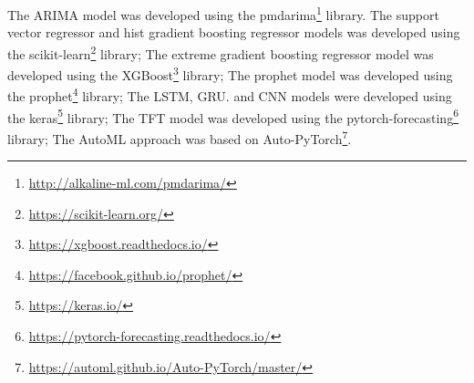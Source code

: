 The ARIMA model was developed using the pmdarima\footnote{ \url{http://alkaline-ml.com/pmdarima/} } library.
The support vector regressor and hist gradient boosting regressor models was developed using the scikit-learn\footnote{ \url{https://scikit-learn.org/} } library;
The extreme gradient boosting regressor model was developed using the XGBoost\footnote{ \url{https://xgboost.readthedocs.io/} } library;
The prophet model was developed using the prophet\footnote{ \url{https://facebook.github.io/prophet/} } library;
The LSTM, GRU. and CNN models were developed using the keras\footnote{ \url{https://keras.io/} } library;
The TFT model was developed using the pytorch-forecasting\footnote{ \url{https://pytorch-forecasting.readthedocs.io/} } library;
The AutoML approach was based on Auto-PyTorch\footnote{ \url{https://automl.github.io/Auto-PyTorch/master/} }.
